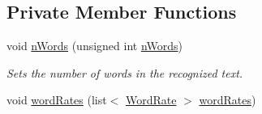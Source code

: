 \subsection*{Private Member Functions}
\begin{CompactItemize}
\item 
\hypertarget{class_statistics_b18396a6d202a0f5ab43e1e0a317f274}{
void \hyperlink{class_statistics_b18396a6d202a0f5ab43e1e0a317f274}{nWords} (unsigned int \hyperlink{class_statistics_cef381529a0baef3870133f42b6aa8dd}{nWords})}
\label{class_statistics_b18396a6d202a0f5ab43e1e0a317f274}

\begin{CompactList}\small\item\em Sets the number of words in the recognized text. \item\end{CompactList}\item 
\hypertarget{class_statistics_be5c00c79f0ba8f81804b52b36b3441d}{
void \hyperlink{class_statistics_be5c00c79f0ba8f81804b52b36b3441d}{wordRates} (list$<$ \hyperlink{struct_word_rate}{WordRate} $>$ \hyperlink{class_statistics_f656c644cb43977450422c215b2130c6}{wordRates})}
\label{class_statistics_be5c00c79f0ba8f81804b52b36b3441d}


\end{CompactItemize}
